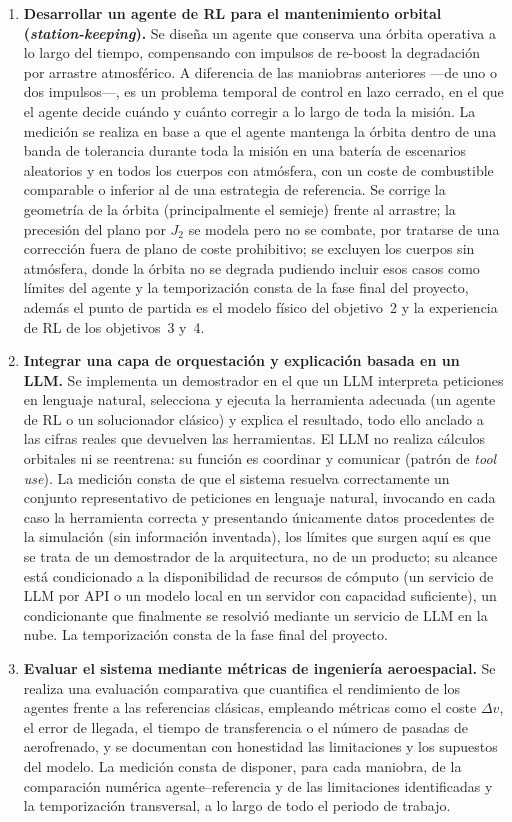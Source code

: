 \begin{enumerate}
\item \textbf{Desarrollar un agente de RL para el mantenimiento orbital
  (\textit{station-keeping}).} Se diseña un agente que conserva una órbita operativa a lo largo del tiempo, compensando con impulsos de re-boost la degradación por arrastre atmosférico. A diferencia de las maniobras anteriores ---de uno o dos impulsos---, es un problema temporal de control en lazo cerrado, en el que el agente decide cuándo y cuánto corregir a lo largo de toda la misión. La medición se realiza en base a que el agente mantenga la órbita dentro de una banda de tolerancia durante toda la misión en una batería de escenarios aleatorios y en todos los cuerpos con atmósfera, con un coste de combustible comparable o inferior al de una estrategia de referencia. Se corrige la geometría de la órbita (principalmente el semieje) frente al arrastre; la precesión del plano por $J_2$ se modela pero no se combate, por tratarse de una corrección fuera de plano de coste prohibitivo; se excluyen los cuerpos sin atmósfera, donde la órbita no se degrada pudiendo incluir esos casos como límites del agente y la temporización consta de la fase final del proyecto, además el punto de partida es el modelo físico del objetivo~2 y la experiencia de RL de los objetivos~3 y~4.

  \item \textbf{Integrar una capa de orquestación y explicación basada en un \gls{LLM}.} Se implementa un demostrador en el que un \gls{LLM} interpreta peticiones en lenguaje natural, selecciona y ejecuta la herramienta adecuada (un agente de \gls{RL} o un solucionador clásico) y explica el resultado, todo ello anclado a las cifras reales que devuelven las herramientas. El \gls{LLM}  no realiza cálculos orbitales ni se reentrena: su función es coordinar y comunicar (patrón de \textit{tool use}). La medición consta de que el sistema resuelva correctamente un conjunto representativo de peticiones en lenguaje natural, invocando en cada caso la herramienta correcta y presentando únicamente datos procedentes de la simulación (sin información inventada), los límites que surgen aquí es que se trata de un demostrador de la arquitectura, no de un producto; su alcance está condicionado a la disponibilidad de recursos de cómputo (un servicio de \gls{LLM}  por \gls{API}  o un modelo local en un servidor con capacidad suficiente), un condicionante que finalmente se resolvió mediante un servicio de LLM en la nube. La temporización consta de la fase final del proyecto.

  \item \textbf{Evaluar el sistema mediante métricas de ingeniería aeroespacial.} Se realiza una evaluación comparativa que cuantifica el rendimiento de los agentes frente a las referencias clásicas, empleando métricas como el coste $\Delta v$, el error de llegada, el tiempo de transferencia o el número de pasadas de aerofrenado, y se documentan con honestidad las limitaciones y los supuestos del modelo. La medición consta de disponer, para cada maniobra, de la comparación numérica agente--referencia y de las limitaciones identificadas y la temporización transversal, a lo largo de todo el periodo de trabajo.

\end{enumerate}

